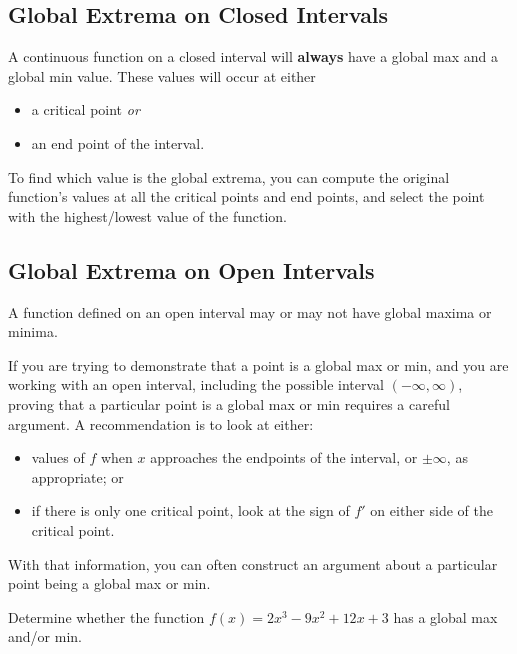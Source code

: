 \begin{boxnote}
\subsection*{Global Extrema on Closed Intervals}

A continuous function on a closed interval will {\bf always} have a
global max and a global min value.  These values will occur at either
\begin{itemize}
\item a critical point {\em or}
\item an end point of the interval.
\end{itemize}
To find which value is the global extrema, you can compute the
original function's values at all the critical points and end points,
and select the point with the highest/lowest value of the function.

\end{boxnote}


\newpage
\begin{boxnote}
\subsection*{Global Extrema on Open Intervals}

A function defined on an open interval may or may not have global
maxima or minima.  
\vsc

If you are trying to demonstrate that a point is a global max or min,
and you are working with an open interval, including the possible
interval $(-\infty, \infty)$, proving that a particular point is a global
max or min requires a careful argument.  A recommendation is to look
at either:
\begin{itemize}
\item values of $f$ when $x$ approaches the endpoints of the interval,
  or $\pm \infty$, as appropriate; or
\item if there is only one critical point, look at the sign of $f'$ on
  either side of the critical point.
\end{itemize}
With that information, you can often construct an argument about a
particular point being a global max or min.

\end{boxnote}

\newpage

\problem Determine whether the function $f(x) = 2 x^3 - 9 x^2 + 12 x
  +3$ has a global max and/or min.

